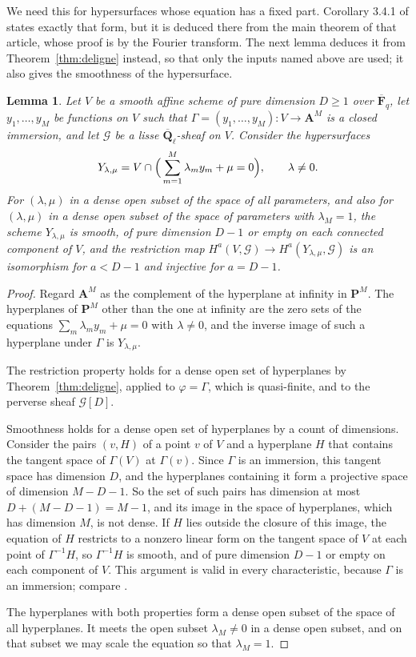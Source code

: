 \documentclass[11pt,a4paper]{article}
\theoremstyle{plain}
\newtheorem{lemma}[theorem]{Lemma}
\theoremstyle{remark}
\newcommand{\Fqb}{\overline{\mathbf F}_q}
\newcommand{\Ql}{\overline{\mathbf Q}_\ell}
\newcommand{\A}{\mathbf A}
\newcommand{\G}{\mathcal G}
\begin{document}
We need this for hypersurfaces whose equation has a fixed part. Corollary 3.4.1 of \cite{KatzACT} states exactly that
form, but it is deduced there from the main theorem of that article, whose proof is by the Fourier transform. The
next lemma deduces it from Theorem~\ref{thm:deligne} instead, so that only the inputs named above are used; it also
gives the smoothness of the hypersurface.

\begin{lemma}\label{lem:good}
Let $V$ be a smooth affine scheme of pure dimension $D\ge1$ over $\Fqb$, let $y_1,\dots,y_M$ be functions on $V$
such that $\Gamma=(y_1,\dots,y_M):V\to\A^M$ is a closed immersion, and let $\G$ be a lisse $\Ql$-sheaf on $V$.
Consider the hypersurfaces
\[
Y_{\lambda,\mu}=V\cap\Bigl(\,\sum_{m=1}^M\lambda_my_m+\mu=0\Bigr),\qquad\lambda\ne0.
\]
For $(\lambda,\mu)$ in a dense open subset of the space of all parameters, and also for $(\lambda,\mu)$ in a dense
open subset of the space of parameters with $\lambda_M=1$, the scheme $Y_{\lambda,\mu}$ is smooth, of pure dimension
$D-1$ or empty on each connected component of $V$, and the restriction map
$H^a(V,\G)\to H^a(Y_{\lambda,\mu},\G)$ is an isomorphism for $a<D-1$ and injective for $a=D-1$.
\end{lemma}

\begin{proof}
Regard $\A^M$ as the complement of the hyperplane at infinity in $\mathbf P^M$. The hyperplanes of $\mathbf P^M$
other than the one at infinity are the zero sets of the equations $\sum_m\lambda_my_m+\mu=0$ with $\lambda\ne0$, and
the inverse image of such a hyperplane under $\Gamma$ is $Y_{\lambda,\mu}$.

The restriction property holds for a dense open set of hyperplanes by Theorem~\ref{thm:deligne}, applied to
$\varphi=\Gamma$, which is quasi-finite, and to the perverse sheaf $\G[D]$.

Smoothness holds for a dense open set of hyperplanes by a count of dimensions. Consider the pairs $(v,H)$ of a point
$v$ of $V$ and a hyperplane $H$ that contains the tangent space of $\Gamma(V)$ at $\Gamma(v)$. Since $\Gamma$ is an
immersion, this tangent space has dimension $D$, and the hyperplanes containing it form a projective space of
dimension $M-D-1$. So the set of such pairs has dimension at most $D+(M-D-1)=M-1$, and its image in the space of
hyperplanes, which has dimension $M$, is not dense. If $H$ lies outside the closure of this image, the equation of
$H$ restricts to a nonzero linear form on the tangent space of $V$ at each point of $\Gamma^{-1}H$, so
$\Gamma^{-1}H$ is smooth, and of pure dimension $D-1$ or empty on each component of $V$. This argument is valid in
every characteristic, because $\Gamma$ is an immersion; compare \cite[I.6.10]{Jouanolou}.

The hyperplanes with both properties form a dense open subset of the space of all hyperplanes. It meets the open
subset $\lambda_M\ne0$ in a dense open subset, and on that subset we may scale the equation so that $\lambda_M=1$.
\end{proof}
\end{document}

